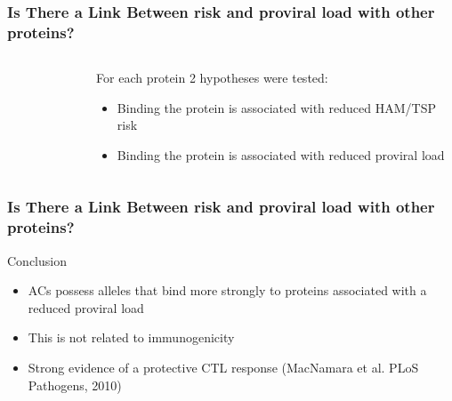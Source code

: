 \documentclass[slidescentered,compress]{beamer}
\begin{document}
\frame
{
\frametitle{Is There a Link Between risk and proviral load with other proteins?}
\begin{columns}[c]

\begin{column}{5cm}
\begin{figure}
\end{figure}
\end{column}

\begin{column}{5cm}
For each protein 2 hypotheses were tested:
\begin{itemize}
\item Binding the protein is associated with reduced HAM/TSP risk
\item Binding the protein is associated with reduced proviral load
\end{itemize}
\end{column}

\end{columns}
}

\frame
{
\frametitle{Is There a Link Between risk and proviral load with other proteins?}

\begin{block}{Conclusion}
\begin{itemize}
\pause
\item ACs possess alleles that bind more strongly to proteins associated with a reduced proviral load
\pause
\item This is not related to immunogenicity
\pause
\item Strong evidence of a protective CTL response (MacNamara et al. PLoS Pathogens, 2010)
\end{itemize}
\end{block}

}


%
%
%
\end{document}
